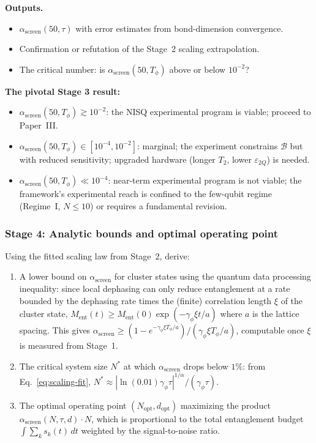 \documentclass[12pt,letterpaper]{article}
\theoremstyle{plain}
\theoremstyle{definition}
\newcommand{\asc}{\alpha_{\mathrm{screen}}}
\newcommand{\Bobs}{\mathcal{B}}
\begin{document}
\textbf{Outputs.}
\begin{itemize}[noitemsep]
  \item $\asc(50,\tau)$ with error estimates from bond-dimension convergence.
  \item Confirmation or refutation of the Stage~2 scaling extrapolation.
  \item The critical number: is $\asc(50, T_\phi)$ above or below $10^{-2}$?
\end{itemize}

\begin{keybox}
\textbf{The pivotal Stage 3 result:}
\begin{itemize}[noitemsep]
  \item $\asc(50,T_\phi) \gtrsim 10^{-2}$: the NISQ experimental program is viable; proceed to Paper~III.
  \item $\asc(50,T_\phi) \in [10^{-4}, 10^{-2}]$: marginal; the experiment constrains $\Bobs$ but with reduced sensitivity; upgraded hardware (longer $T_2$, lower $\varepsilon_{2Q}$) is needed.
  \item $\asc(50,T_\phi) \ll 10^{-4}$: near-term experimental program is not viable; the framework's experimental reach is confined to the few-qubit regime (Regime~I, $N \leq 10$) or requires a fundamental revision.
\end{itemize}
\end{keybox}

\subsubsection*{Stage 4: Analytic bounds and optimal operating point}

Using the fitted scaling law from Stage~2, derive:
\begin{enumerate}[label=(\arabic*),noitemsep]
  \item A lower bound on $\asc$ for cluster states using the quantum data processing inequality: since local dephasing can only reduce entanglement at a rate bounded by the dephasing rate times the (finite) correlation length $\xi$ of the cluster state, $M_{\mathrm{ent}}(t) \geq M_{\mathrm{ent}}(0)\exp(-\gamma_\phi\xi t/a)$ where $a$ is the lattice spacing.  This gives $\asc \geq (1-e^{-\gamma_\phi\xi T_\phi/a})/(\gamma_\phi\xi T_\phi/a)$, computable once $\xi$ is measured from Stage~1.
  \item The critical system size $N^*$ at which $\asc$ drops below $1\%$: from Eq.~\eqref{eq:scaling-fit}, $N^* \approx |\ln(0.01)\gamma_\phi\tau|^{1/\alpha}/(\gamma_\phi\tau)$.
  \item The optimal operating point $(N_{\mathrm{opt}}, d_{\mathrm{opt}})$ maximizing the product $\asc(N,\tau,d)\cdot N$, which is proportional to the total entanglement budget $\int\sum_k s_k(t)\,dt$ weighted by the signal-to-noise ratio.
\end{enumerate}
\end{document}
